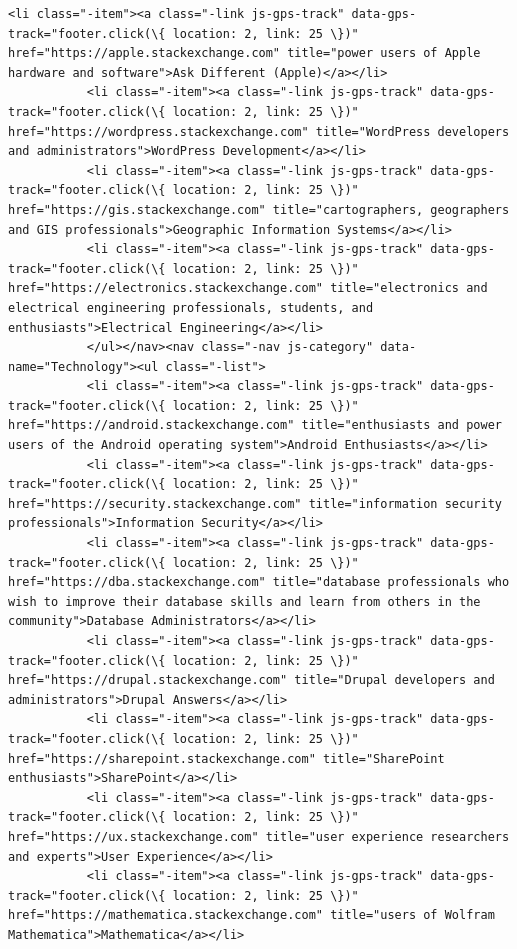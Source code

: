 \documentclass[11pt]{article}
\begin{document}
\begin{Verbatim}[commandchars=\\\{\}]
           <li class="-item"><a class="-link js-gps-track" data-gps-track="footer.click(\{ location: 2, link: 25 \})" href="https://apple.stackexchange.com" title="power users of Apple hardware and software">Ask Different (Apple)</a></li>
           <li class="-item"><a class="-link js-gps-track" data-gps-track="footer.click(\{ location: 2, link: 25 \})" href="https://wordpress.stackexchange.com" title="WordPress developers and administrators">WordPress Development</a></li>
           <li class="-item"><a class="-link js-gps-track" data-gps-track="footer.click(\{ location: 2, link: 25 \})" href="https://gis.stackexchange.com" title="cartographers, geographers and GIS professionals">Geographic Information Systems</a></li>
           <li class="-item"><a class="-link js-gps-track" data-gps-track="footer.click(\{ location: 2, link: 25 \})" href="https://electronics.stackexchange.com" title="electronics and electrical engineering professionals, students, and enthusiasts">Electrical Engineering</a></li>
           </ul></nav><nav class="-nav js-category" data-name="Technology"><ul class="-list">
           <li class="-item"><a class="-link js-gps-track" data-gps-track="footer.click(\{ location: 2, link: 25 \})" href="https://android.stackexchange.com" title="enthusiasts and power users of the Android operating system">Android Enthusiasts</a></li>
           <li class="-item"><a class="-link js-gps-track" data-gps-track="footer.click(\{ location: 2, link: 25 \})" href="https://security.stackexchange.com" title="information security professionals">Information Security</a></li>
           <li class="-item"><a class="-link js-gps-track" data-gps-track="footer.click(\{ location: 2, link: 25 \})" href="https://dba.stackexchange.com" title="database professionals who wish to improve their database skills and learn from others in the community">Database Administrators</a></li>
           <li class="-item"><a class="-link js-gps-track" data-gps-track="footer.click(\{ location: 2, link: 25 \})" href="https://drupal.stackexchange.com" title="Drupal developers and administrators">Drupal Answers</a></li>
           <li class="-item"><a class="-link js-gps-track" data-gps-track="footer.click(\{ location: 2, link: 25 \})" href="https://sharepoint.stackexchange.com" title="SharePoint enthusiasts">SharePoint</a></li>
           <li class="-item"><a class="-link js-gps-track" data-gps-track="footer.click(\{ location: 2, link: 25 \})" href="https://ux.stackexchange.com" title="user experience researchers and experts">User Experience</a></li>
           <li class="-item"><a class="-link js-gps-track" data-gps-track="footer.click(\{ location: 2, link: 25 \})" href="https://mathematica.stackexchange.com" title="users of Wolfram Mathematica">Mathematica</a></li>

\end{Verbatim}
\end{document}
